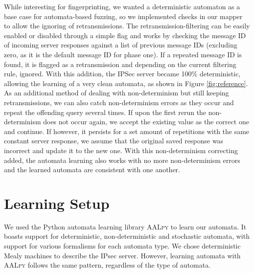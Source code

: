 While interesting for fingerprinting, we wanted a deterministic automaton as a base case for automata-based fuzzing, so we implemented checks in our mapper to allow the ignoring of retransmissions. The retransmission-filtering can be easily enabled or disabled through a simple flag and works by checking the message ID of incoming server responses against a list of previous message IDs (excluding zero, as it is the default message ID for phase one). If a repeated message ID is found, it is flagged as a retransmission and depending on the current filtering rule, ignored. With this addition, the IPSec server became 100\% deterministic, allowing the learning of a very clean automata, as shown in Figure \ref{fig:reference}. As an additional method of dealing with non-determinism but still keeping retransmissions, we can also catch non-determinism errors as they occur and repeat the offending query several times. If upon the first rerun the non-determinism does not occur again, we accept the existing value as the correct one and continue. If however, it persists for a set amount of repetitions with the same constant server response, we assume that the original saved response was incorrect and update it to the new one. With this non-determinism correcting added, the automata learning also works with no more non-determinism errors and the learned automata are consistent with one another.


\section{Learning Setup} \label{subsec:learningenv}%
We used the Python automata learning library \textsc{AALpy} to learn our automata. It boasts support for deterministic, non-deterministic and stochastic automata, with support for various formalisms for each automata type. We chose deterministic Mealy machines to describe the IPsec server. However, learning automata with \textsc{AALpy} follows the same pattern, regardless of the type of automata.


